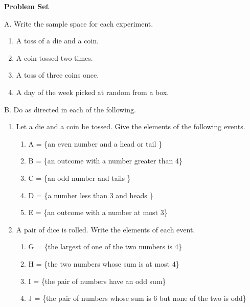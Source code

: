 \textbf{Problem Set}

\vspce

A. Write the sample space for each experiment.
\begin{enumerate}[label = \arabic*. ]
\item A toss of a die and a coin. 
\item A coin tossed two times. 
\item A toss of three coins once. 
\item A day of the week picked at random from a box. 
\end{enumerate} 


B. Do as directed in each of the following. 
\begin{enumerate}[label = \arabic*. ]
\item Let a die and a coin be tossed. Give the elements of the following events. 
\begin{enumerate}[label = \alph*. ]
\item A = \{an even number and a head or tail \}
\item B = \{an outcome with a number greater than 4\}
\item C = \{an odd number and tails \}
\item D = \{a number less than 3 and heads \}
\item E = \{an outcome with a number at most 3\}
\end{enumerate}  
\item A pair of dice is rolled. Write the elements of each event. 
\begin{enumerate}[label = \alph*. ]
\item G = \{the largest of one of the two numbers is 4\}
\item H = \{the two numbers whose sum is at most 4\}
\item I = \{the pair of numbers have an odd sum\}
\item J = \{the pair of numbers whose sum is 6 but none of the two is odd\}
\end{enumerate}  

\end{enumerate}  